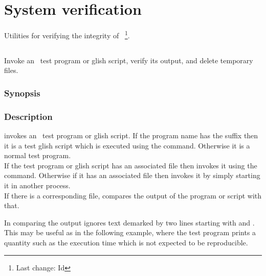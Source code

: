 \chapter{System verification}
\label{System verification}

Utilities for verifying the integrity of \aipspp\ \footnote{Last change:
$ $Id$ $}.


\section{}
\label{assay}
 
Invoke an \aipspp\ test program or glish script, verify its output,
and delete temporary files.

\subsection*{Synopsis}
 
\begin{synopsis}
\end{synopsis}
 
\subsection*{Description}
 
 invokes an \aipspp\ test program or glish script.
If the program name has the suffix  then it is a test glish
script which is executed using the  command.
Otherwise it is a normal test program.
\\If the test program or glish script has an
associated  file then  invokes it using
the  command.  Otherwise if it has an associated
 file then  invokes it by simply starting
it in another process.
\\
If there is a corresponding  file,  compares
the output of the program or script with that.

In comparing the output  ignores text demarked by two lines
starting with \code{>>>} and \code{<<<}.  This may be useful as in the
following example, where the test program prints a quantity such as the
execution time which is not expected to be reproducible.

